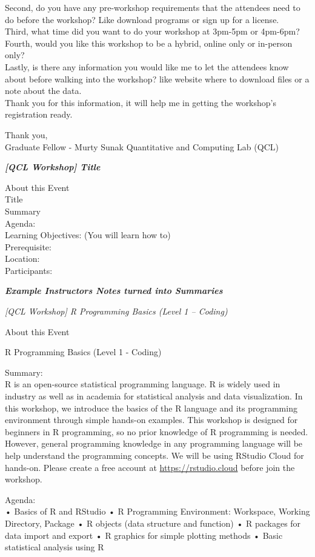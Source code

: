 \documentclass[
]{book}
\begin{document}
Second, do you have any pre-workshop requirements that the attendees need to do before the workshop? Like download programs or sign up for a license.\\
Third, what time did you want to do your workshop at 3pm-5pm or 4pm-6pm?\\
Fourth, would you like this workshop to be a hybrid, online only or in-person only?\\
Lastly, is there any information you would like me to let the attendees know about before walking into the workshop? like website where to download files or a note about the data.\\
Thank you for this information, it will help me in getting the workshop's registration ready.

Thank you,\\
Graduate Fellow - Murty Sunak Quantitative and Computing Lab (QCL)

\textbf{\emph{{[}QCL Workshop{]} Title}}

About this Event\\
Title\\
Summary\\
Agenda:\\
Learning Objectives: (You will learn how to)\\
Prerequisite:\\
Location:\\
Participants:

\textbf{\emph{Example Instructors Notes turned into Summaries}}

\emph{{[}QCL Workshop{]} R Programming Basics (Level 1 -- Coding)}

About this Event

R Programming Basics (Level 1 - Coding)

Summary:\\
R is an open-source statistical programming language. R is widely used in industry as well as in academia for statistical analysis and data visualization. In this workshop, we introduce the basics of the R language and its programming environment through simple hands-on examples.
This workshop is designed for beginners in R programming, so no prior knowledge of R programming is needed. However, general programming knowledge in any programming language will be help understand the programming concepts.
We will be using RStudio Cloud for hands-on. Please create a free account at \url{https://rstudio.cloud} before join the workshop.

Agenda:\\
• Basics of R and RStudio
• R Programming Environment: Workspace, Working Directory, Package
• R objects (data structure and function)
• R packages for data import and export
• R graphics for simple plotting methods
• Basic statistical analysis using R
\end{document}

